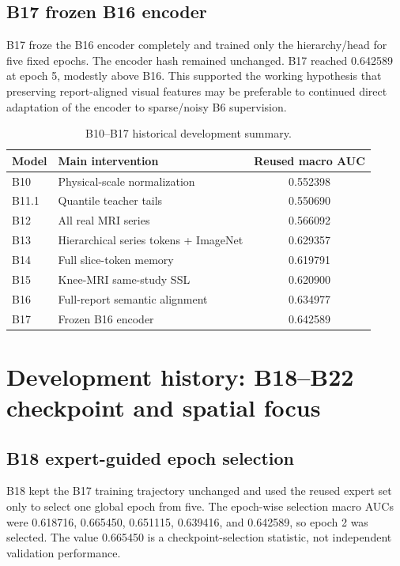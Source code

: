 \documentclass[preprint,12pt]{elsarticle}
\begin{document}
\subsection{B17 frozen B16 encoder}
B17 froze the B16 encoder completely and trained only the hierarchy/head for five fixed epochs. The encoder hash remained unchanged. B17 reached 0.642589 at epoch 5, modestly above B16. This supported the working hypothesis that preserving report-aligned visual features may be preferable to continued direct adaptation of the encoder to sparse/noisy B6 supervision.

\begin{table}[ht]
\centering
\caption{B10--B17 historical development summary.}
\label{tab:b10b17}
\begin{tabular}{llc}
\toprule
Model & Main intervention & Reused macro AUC \\
\midrule
B10 & Physical-scale normalization & 0.552398 \\
B11.1 & Quantile teacher tails & 0.550690 \\
B12 & All real MRI series & 0.566092 \\
B13 & Hierarchical series tokens + ImageNet & 0.629357 \\
B14 & Full slice-token memory & 0.619791 \\
B15 & Knee-MRI same-study SSL & 0.620900 \\
B16 & Full-report semantic alignment & 0.634977 \\
B17 & Frozen B16 encoder & 0.642589 \\
\bottomrule
\end{tabular}
\end{table}

\section{Development history: B18--B22 checkpoint and spatial focus}
\label{sec:b18b22}

\subsection{B18 expert-guided epoch selection}
B18 kept the B17 training trajectory unchanged and used the reused expert set only to select one global epoch from five. The epoch-wise selection macro AUCs were 0.618716, 0.665450, 0.651115, 0.639416, and 0.642589, so epoch 2 was selected. The value 0.665450 is a checkpoint-selection statistic, not independent validation performance.
\end{document}
